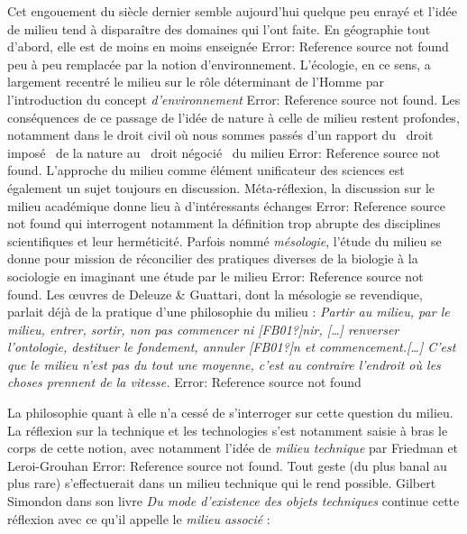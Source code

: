 \hypertarget{RefHeading311699228146}{}{\sffamily\color{black}
Cet engouement du si\`ecle dernier semble aujourd'hui quelque peu enray\'e et l'id\'ee de milieu tend \`a dispara\^itre
des domaines qui l'ont faite. En g\'eographie tout d'abord, elle est de moins en moins enseign\'ee Error: Reference
source not found peu \`a peu remplac\'ee par la notion d'environnement. L'\'ecologie, en ce sens, a largement
recentr\'e le milieu sur le r\^ole d\'eterminant de l'Homme par l'introduction du concept \textit{d'environnement}
Error: Reference source not found. Les cons\'equences de ce passage de l'id\'ee de nature \`a celle de milieu restent
profondes, notamment dans le droit civil o\`u nous sommes pass\'es d'un rapport du {\guillemotleft}~droit
impos\'e~{\guillemotright} de la nature au {\guillemotleft}~droit n\'egoci\'e~{\guillemotright} du milieu Error:
Reference source not found. L'approche du milieu comme \'el\'ement unificateur des sciences est \'egalement un sujet
toujours en discussion. M\'eta-r\'eflexion, la discussion sur le {\textquotedbl}milieu acad\'emique{\textquotedbl}
donne lieu \`a d'int\'eressants \'echanges Error: Reference source not found qui interrogent notamment la d\'efinition
trop abrupte des disciplines scientifiques et leur herm\'eticit\'e. Parfois nomm\'e \textit{m\'esologie}, l'\'etude du
milieu se donne pour mission de r\'econcilier des pratiques diverses de la biologie \`a la sociologie en imaginant une
\'etude par le milieu Error: Reference source not found. Les {\oe}uvres de Deleuze \& Guattari, dont la m\'esologie se
revendique, parlait d\'ej\`a de la pratique d'une philosophie du milieu : \textit{{\textquotedbl}Partir au milieu, par
le milieu, entrer, sortir, non pas commencer ni [FB01?]nir, [{\dots}] renverser l'ontologie, destituer le fondement,
annuler [FB01?]n et commencement.[{\dots}] C'est que le milieu n'est pas du tout une moyenne, c'est au contraire
l'endroit o\`u les choses prennent de la vitesse.{\textquotedbl}} Error: Reference source not found }

{\color{black}
La philosophie quant \`a elle n'a cess\'e de s'interroger sur cette question du milieu. La r\'eflexion sur la technique
et les technologies s'est notamment saisie \`a bras le corps de cette notion, avec notamment l'id\'ee de \textit{milieu
technique} par Friedman et Leroi-Grouhan Error: Reference source not found. Tout geste (du plus banal au plus rare)
s'effectuerait dans un milieu technique qui le rend possible. Gilbert Simondon dans son livre \textit{Du mode
d'existence des objets techniques} continue cette r\'eflexion avec ce qu'il appelle le \textit{milieu associ\'e} : }

